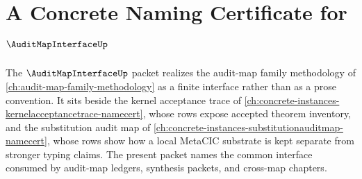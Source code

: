 \chapter{A Concrete Naming Certificate for $\AuditMapInterfaceUp$}
\label{ch:concrete-instances-auditmapinterface-namecert}

The $\AuditMapInterfaceUp$ packet realizes the audit-map family methodology of \autoref{ch:audit-map-family-methodology} as a finite interface rather than as a prose convention. It sits beside the kernel acceptance trace of \autoref{ch:concrete-instances-kernelacceptancetrace-namecert}, whose rows expose accepted theorem inventory, and the substitution audit map of \autoref{ch:concrete-instances-substitutionauditmap-namecert}, whose rows show how a local MetaCIC substrate is kept separate from stronger typing claims. The present packet names the common interface consumed by audit-map ledgers, synthesis packets, and cross-map chapters.

